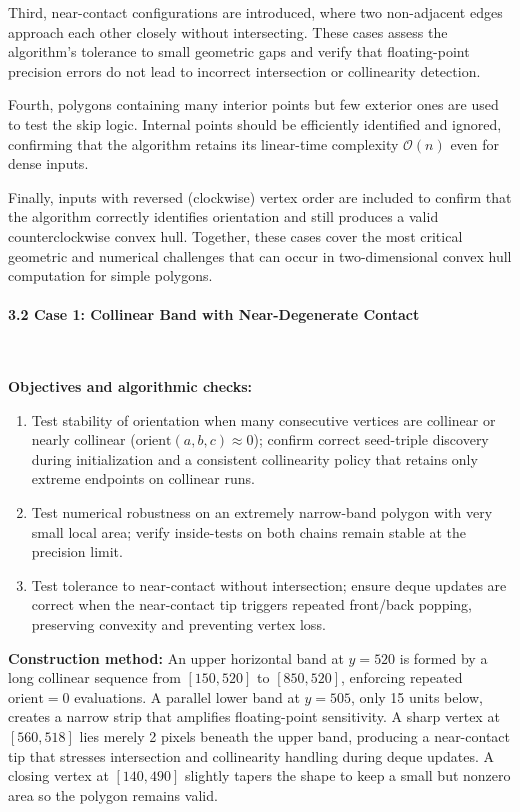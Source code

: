 \documentclass{article}
\begin{document}
Third, near-contact configurations are introduced, where two non-adjacent edges approach each other closely without intersecting. 
These cases assess the algorithm’s tolerance to small geometric gaps and verify that floating-point precision errors do not lead to incorrect intersection or collinearity detection.

Fourth, polygons containing many interior points but few exterior ones are used to test the skip logic. 
Internal points should be efficiently identified and ignored, confirming that the algorithm retains its linear-time complexity $\mathcal{O}(n)$ even for dense inputs.

Finally, inputs with reversed (clockwise) vertex order are included to confirm that the algorithm correctly identifies orientation and still produces a valid counterclockwise convex hull. 
Together, these cases cover the most critical geometric and numerical challenges that can occur in two-dimensional convex hull computation for simple polygons.

\paragraph{3.2 Case 1: Collinear Band with Near-Degenerate Contact}\

\textbf{Objectives and algorithmic checks:}
\begin{enumerate}
    \item Test stability of orientation when many consecutive vertices are collinear or nearly collinear ($\text{orient}(a,b,c)\!\approx\!0$); confirm correct seed-triple discovery during initialization and a consistent collinearity policy that retains only extreme endpoints on collinear runs.
    \item Test numerical robustness on an extremely narrow-band polygon with very small local area; verify inside-tests on both chains remain stable at the precision limit.
    \item Test tolerance to near-contact without intersection; ensure deque updates are correct when the near-contact tip triggers repeated front/back popping, preserving convexity and preventing vertex loss.
\end{enumerate}

\textbf{Construction method:}
An upper horizontal band at $y=520$ is formed by a long collinear sequence from $[150,520]$ to $[850,520]$, enforcing repeated $\text{orient}=0$ evaluations. A parallel lower band at $y=505$, only 15 units below, creates a narrow strip that amplifies floating-point sensitivity. A sharp vertex at $[560,518]$ lies merely 2 pixels beneath the upper band, producing a near-contact tip that stresses intersection and collinearity handling during deque updates. A closing vertex at $[140,490]$ slightly tapers the shape to keep a small but nonzero area so the polygon remains valid.
\end{document}
